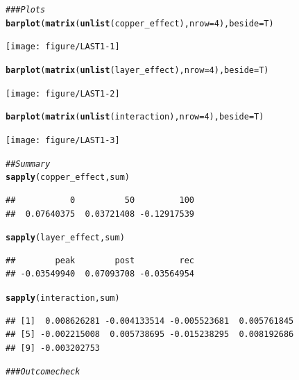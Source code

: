 \documentclass{article}\usepackage[]{graphicx}\usepackage[]{color}
\makeatletter
\newcommand{\hlnum}[1]{\textcolor[rgb]{0.686,0.059,0.569}{#1}}%
\newcommand{\hlcom}[1]{\textcolor[rgb]{0.678,0.584,0.686}{\textit{#1}}}%
\newcommand{\hlstd}[1]{\textcolor[rgb]{0.345,0.345,0.345}{#1}}%
\newcommand{\hlkwc}[1]{\textcolor[rgb]{0.333,0.667,0.333}{#1}}%
\newcommand{\hlkwd}[1]{\textcolor[rgb]{0.737,0.353,0.396}{\textbf{#1}}}%
\newenvironment{kframe}{%
 \def\at@end@of@kframe{}%
 \ifinner\ifhmode%
  \def\at@end@of@kframe{\end{minipage}}%
  \begin{minipage}{\columnwidth}%
 \fi\fi%
 \def\FrameCommand##1{\hskip\@totalleftmargin \hskip-\fboxsep
 \colorbox{shadecolor}{##1}\hskip-\fboxsep
     \hskip-\linewidth \hskip-\@totalleftmargin \hskip\columnwidth}%
 \MakeFramed {\advance\hsize-\width
   \@totalleftmargin\z@ \linewidth\hsize
   \@setminipage}}%
 {\par\unskip\endMakeFramed%
 \at@end@of@kframe}
\newenvironment{knitrout}{}{} %
\makeatother
\begin{document}
\begin{knitrout}
\begin{kframe}
\begin{alltt}
\hlcom{### Plots}
\hlkwd{barplot}\hlstd{(}\hlkwd{matrix}\hlstd{(}\hlkwd{unlist}\hlstd{(copper_effect),}\hlkwc{nrow}\hlstd{=}\hlnum{4}\hlstd{),}\hlkwc{beside}\hlstd{=T)}
\end{alltt}
\end{kframe}
\texttt{[image: figure/LAST1-1]} 
\begin{kframe}\begin{alltt}
\hlkwd{barplot}\hlstd{(}\hlkwd{matrix}\hlstd{(}\hlkwd{unlist}\hlstd{(layer_effect),}\hlkwc{nrow}\hlstd{=}\hlnum{4}\hlstd{),}\hlkwc{beside}\hlstd{=T)}
\end{alltt}
\end{kframe}
\texttt{[image: figure/LAST1-2]} 
\begin{kframe}\begin{alltt}
\hlkwd{barplot}\hlstd{(}\hlkwd{matrix}\hlstd{(}\hlkwd{unlist}\hlstd{(interaction),}\hlkwc{nrow}\hlstd{=}\hlnum{4}\hlstd{),}\hlkwc{beside}\hlstd{=T)}
\end{alltt}
\end{kframe}
\texttt{[image: figure/LAST1-3]} 
\begin{kframe}\begin{alltt}
\hlcom{## Summary}
\hlkwd{sapply}\hlstd{(copper_effect,sum)}
\end{alltt}
\begin{verbatim}
##           0          50         100 
##  0.07640375  0.03721408 -0.12917539
\end{verbatim}
\begin{alltt}
\hlkwd{sapply}\hlstd{(layer_effect,sum)}
\end{alltt}
\begin{verbatim}
##        peak        post         rec 
## -0.03549940  0.07093708 -0.03564954
\end{verbatim}
\begin{alltt}
\hlkwd{sapply}\hlstd{(interaction,sum)}
\end{alltt}
\begin{verbatim}
## [1]  0.008626281 -0.004133514 -0.005523681  0.005761845
## [5] -0.002215008  0.005738695 -0.015238295  0.008192686
## [9] -0.003202753
\end{verbatim}
\begin{alltt}
\hlcom{### Outcome check}


\end{alltt}
\end{kframe}
\end{knitrout}
\end{document}
